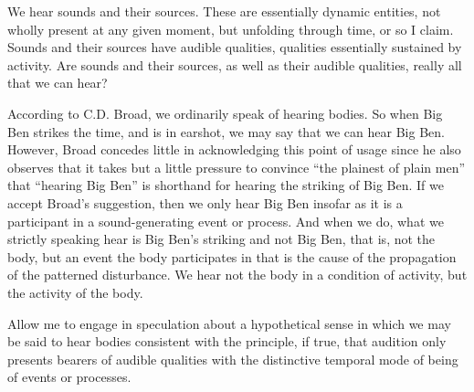 \documentclass[12pt]{article}
\begin{document}
We hear sounds and their sources. These are essentially dynamic entities, not wholly present at any given moment, but unfolding through time, or so I claim. Sounds and their sources have audible qualities, qualities essentially sustained by activity. Are sounds and their sources, as well as their audible qualities, really all that we can hear?

According to C.D. Broad, we ordinarily speak of hearing bodies. So when Big Ben strikes the time, and is in earshot, we may say that we can hear Big Ben. However, Broad concedes little in acknowledging this point of usage since he also observes that it takes but a little pressure to convince “the plainest of plain men” that “hearing Big Ben” is shorthand for hearing the striking of Big Ben. If we accept Broad’s suggestion, then we only hear Big Ben insofar as it is a participant in a sound-generating event or process. And when we do, what we strictly speaking hear is Big Ben’s striking and not Big Ben, that is, not the body, but an event the body participates in that is the cause of the propagation of the patterned disturbance. We hear not the body in a condition of activity, but the activity of the body.


Allow me to engage in speculation about a hypothetical sense in which we may be said to hear bodies consistent with the principle, if true, that audition only presents bearers of audible qualities with the distinctive temporal mode of being of events or processes.
\end{document}
